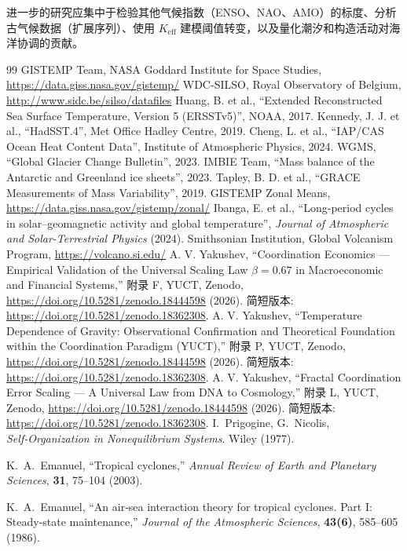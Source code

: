 \documentclass[12pt,a4paper]{article}
\newcommand{\Keff}{K_{\mathrm{eff}}}
\begin{document}
	进一步的研究应集中于检验其他气候指数（ENSO、NAO、AMO）的标度、分析古气候数据（扩展序列）、使用 \(\Keff\) 建模阈值转变，以及量化潮汐和构造活动对海洋协调的贡献。
	
	\begin{thebibliography}{99}
		 GISTEMP Team, NASA Goddard Institute for Space Studies, \url{https://data.giss.nasa.gov/gistemp/}
		 WDC-SILSO, Royal Observatory of Belgium, \url{http://www.sidc.be/silso/datafiles}
		 Huang, B. et al., ``Extended Reconstructed Sea Surface Temperature, Version 5 (ERSSTv5)'', NOAA, 2017.
		 Kennedy, J. J. et al., ``HadSST.4'', Met Office Hadley Centre, 2019.
		 Cheng, L. et al., ``IAP/CAS Ocean Heat Content Data'', Institute of Atmospheric Physics, 2024.
		 WGMS, ``Global Glacier Change Bulletin'', 2023.
		 IMBIE Team, ``Mass balance of the Antarctic and Greenland ice sheets'', 2023.
		 Tapley, B. D. et al., ``GRACE Measurements of Mass Variability'', 2019.
		 GISTEMP Zonal Means, \url{https://data.giss.nasa.gov/gistemp/zonal/}
		 Ibanga, E. et al., ``Long-period cycles in solar–geomagnetic activity and global temperature'', \emph{Journal of Atmospheric and Solar-Terrestrial Physics} (2024).
		 Smithsonian Institution, Global Volcanism Program, \url{https://volcano.si.edu/}
		 A. V. Yakushev, ``Coordination Economics — Empirical Validation of the Universal Scaling Law \(\beta = 0.67\) in Macroeconomic and Financial Systems,'' 附录 F, YUCT, Zenodo, \url{https://doi.org/10.5281/zenodo.18444598} (2026). 简短版本: \url{https://doi.org/10.5281/zenodo.18362308}.
		 A. V. Yakushev, ``Temperature Dependence of Gravity: Observational Confirmation and Theoretical Foundation within the Coordination Paradigm (YUCT),'' 附录 P, YUCT, Zenodo, \url{https://doi.org/10.5281/zenodo.18444598} (2026). 简短版本: \url{https://doi.org/10.5281/zenodo.18362308}.
		 A. V. Yakushev, ``Fractal Coordination Error Scaling — A Universal Law from DNA to Cosmology,'' 附录 L, YUCT, Zenodo, \url{https://doi.org/10.5281/zenodo.18444598} (2026). 简短版本: \url{https://doi.org/10.5281/zenodo.18362308}.
		I.~Prigogine, G.~Nicolis, \emph{Self‑Organization in Nonequilibrium Systems}. Wiley (1977).
		
		K.~A.~Emanuel, ``Tropical cyclones,'' \emph{Annual Review of Earth and Planetary Sciences},
		\textbf{31}, 75--104 (2003).
		
		K.~A.~Emanuel, ``An air‑sea interaction theory for tropical cyclones. Part I:
		Steady‑state maintenance,'' \emph{Journal of the Atmospheric Sciences},
		\textbf{43(6)}, 585--605 (1986).
	\end{thebibliography}
	
\end{document}
